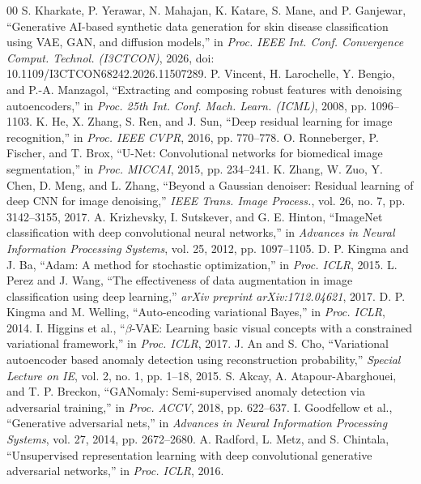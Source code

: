 \documentclass[conference]{IEEEtran}
\begin{document}
\begin{thebibliography}{00}
 S. Kharkate, P. Yerawar, N. Mahajan, K. Katare, S. Mane, and P. Ganjewar, ``Generative AI-based synthetic data generation for skin disease classification using VAE, GAN, and diffusion models,'' in \textit{Proc. IEEE Int. Conf. Convergence Comput. Technol. (I3CTCON)}, 2026, doi: 10.1109/I3CTCON68242.2026.11507289.
 P. Vincent, H. Larochelle, Y. Bengio, and P.-A. Manzagol, ``Extracting and composing robust features with denoising autoencoders,'' in \textit{Proc. 25th Int. Conf. Mach. Learn. (ICML)}, 2008, pp. 1096--1103.
 K. He, X. Zhang, S. Ren, and J. Sun, ``Deep residual learning for image recognition,'' in \textit{Proc. IEEE CVPR}, 2016, pp. 770--778.
 O. Ronneberger, P. Fischer, and T. Brox, ``U-Net: Convolutional networks for biomedical image segmentation,'' in \textit{Proc. MICCAI}, 2015, pp. 234--241.
 K. Zhang, W. Zuo, Y. Chen, D. Meng, and L. Zhang, ``Beyond a Gaussian denoiser: Residual learning of deep CNN for image denoising,'' \textit{IEEE Trans. Image Process.}, vol. 26, no. 7, pp. 3142--3155, 2017.
 A. Krizhevsky, I. Sutskever, and G. E. Hinton, ``ImageNet classification with deep convolutional neural networks,'' in \textit{Advances in Neural Information Processing Systems}, vol. 25, 2012, pp. 1097--1105.
 D. P. Kingma and J. Ba, ``Adam: A method for stochastic optimization,'' in \textit{Proc. ICLR}, 2015.
 L. Perez and J. Wang, ``The effectiveness of data augmentation in image classification using deep learning,'' \textit{arXiv preprint arXiv:1712.04621}, 2017.
 D. P. Kingma and M. Welling, ``Auto-encoding variational Bayes,'' in \textit{Proc. ICLR}, 2014.
 I. Higgins et al., ``$\beta$-VAE: Learning basic visual concepts with a constrained variational framework,'' in \textit{Proc. ICLR}, 2017.
 J. An and S. Cho, ``Variational autoencoder based anomaly detection using reconstruction probability,'' \textit{Special Lecture on IE}, vol. 2, no. 1, pp. 1--18, 2015.
 S. Akcay, A. Atapour-Abarghouei, and T. P. Breckon, ``GANomaly: Semi-supervised anomaly detection via adversarial training,'' in \textit{Proc. ACCV}, 2018, pp. 622--637.
 I. Goodfellow et al., ``Generative adversarial nets,'' in \textit{Advances in Neural Information Processing Systems}, vol. 27, 2014, pp. 2672--2680.
 A. Radford, L. Metz, and S. Chintala, ``Unsupervised representation learning with deep convolutional generative adversarial networks,'' in \textit{Proc. ICLR}, 2016.

\end{thebibliography}
\end{document}
